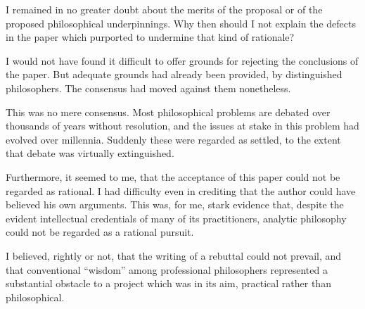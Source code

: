 I remained in no greater doubt about the merits of the proposal or of the proposed philosophical underpinnings.
Why then should I not explain the defects in the paper which purported to undermine that kind of rationale?

I would not have found it difficult to offer grounds for rejecting the conclusions of the paper.
But adequate grounds had already been provided, by distinguished philosophers.
The consensus had moved against them nonetheless.

This was no mere consensus.
Most philosophical problems are debated over thousands of years without resolution, and the issues at stake in this problem had evolved over millennia.
Suddenly these were regarded as settled, to the extent that debate was virtually extinguished.

Furthermore, it seemed to me, that the acceptance of this paper could not be regarded as rational.
I had difficulty even in crediting that the author could have believed his own arguments.
This was, for me, stark evidence that, despite the evident intellectual credentials of many of its practitioners, analytic philosophy could not be regarded as a rational pursuit.

I believed, rightly or not, that the writing of a rebuttal could not prevail, and that conventional ``wisdom'' among professional philosophers represented a substantial obstacle to a project which was in its aim, practical rather than philosophical.


